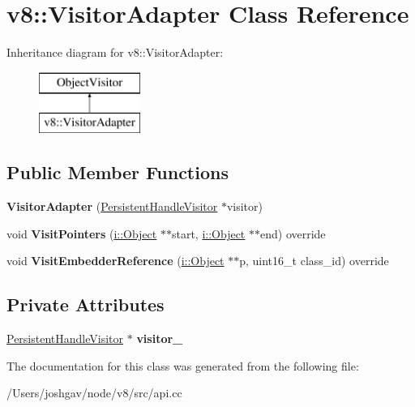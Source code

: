 \hypertarget{classv8_1_1_visitor_adapter}{}\section{v8\+:\+:Visitor\+Adapter Class Reference}
\label{classv8_1_1_visitor_adapter}
Inheritance diagram for v8\+:\+:Visitor\+Adapter\+:\begin{figure}[H]
\begin{center}
\leavevmode
\includegraphics[height=2.000000cm]{classv8_1_1_visitor_adapter}
\end{center}
\end{figure}
\subsection*{Public Member Functions}
\begin{DoxyCompactItemize}
\item 
{\bfseries Visitor\+Adapter} (\hyperlink{classv8_1_1_persistent_handle_visitor}{Persistent\+Handle\+Visitor} $\ast$visitor)\hypertarget{classv8_1_1_visitor_adapter_a2025267d0a13561124fe975ae7d44e23}{}\label{classv8_1_1_visitor_adapter_a2025267d0a13561124fe975ae7d44e23}

\item 
void {\bfseries Visit\+Pointers} (\hyperlink{classv8_1_1internal_1_1_object}{i\+::\+Object} $\ast$$\ast$start, \hyperlink{classv8_1_1internal_1_1_object}{i\+::\+Object} $\ast$$\ast$end) override\hypertarget{classv8_1_1_visitor_adapter_aa3df0150f0b225d63d2c422edcd7f49c}{}\label{classv8_1_1_visitor_adapter_aa3df0150f0b225d63d2c422edcd7f49c}

\item 
void {\bfseries Visit\+Embedder\+Reference} (\hyperlink{classv8_1_1internal_1_1_object}{i\+::\+Object} $\ast$$\ast$p, uint16\+\_\+t class\+\_\+id) override\hypertarget{classv8_1_1_visitor_adapter_adc154d345a290ff455a615fb11fc5194}{}\label{classv8_1_1_visitor_adapter_adc154d345a290ff455a615fb11fc5194}

\end{DoxyCompactItemize}
\subsection*{Private Attributes}
\begin{DoxyCompactItemize}
\item 
\hyperlink{classv8_1_1_persistent_handle_visitor}{Persistent\+Handle\+Visitor} $\ast$ {\bfseries visitor\+\_\+}\hypertarget{classv8_1_1_visitor_adapter_aa5e44b8383dda17b27420b38e8345de8}{}\label{classv8_1_1_visitor_adapter_aa5e44b8383dda17b27420b38e8345de8}

\end{DoxyCompactItemize}


The documentation for this class was generated from the following file\+:\begin{DoxyCompactItemize}
\item 
/\+Users/joshgav/node/v8/src/api.\+cc\end{DoxyCompactItemize}
